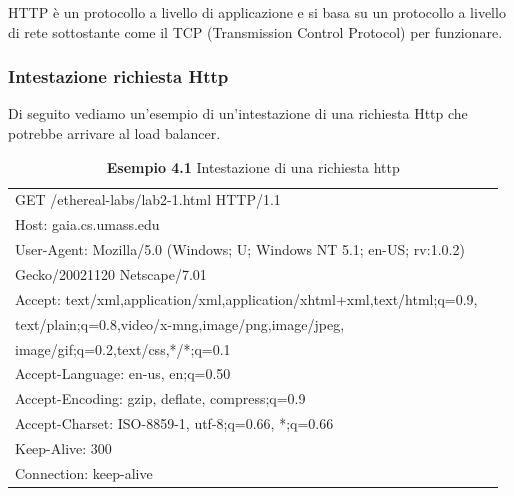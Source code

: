 \documentclass[binding=0.6cm]{sapthesis}
\theoremstyle{definition}
\begin{document}
HTTP è un protocollo a livello di applicazione e si basa su un protocollo a livello di rete sottostante come il TCP (Transmission Control Protocol) per funzionare. 


\subsubsection{Intestazione richiesta Http}
Di seguito vediamo un'esempio di un'intestazione di una richiesta Http che potrebbe arrivare
al load balancer.

\begin{table}[ht]
    \centering
    \caption*{\textbf{Esempio 4.1} Intestazione di una richiesta http}
    \begin{tabular}{ |l|c|}
        \hline
        GET /ethereal-labs/lab2-1.html HTTP/1.1   \\ 
        {Host}: gaia.cs.umass.edu   \\  
        {User-Agent}: Mozilla/5.0 (Windows; U; Windows NT 5.1; en-US; rv:1.0.2) \\Gecko/20021120 Netscape/7.01\\
        {Accept}: text/xml,application/xml,application/xhtml+xml,text/html;q=0.9,\\text/plain;q=0.8,video/x-mng,image/png,image/jpeg,\\image/gif;q=0.2,text/css,*/*;q=0.1\\ 
        {Accept-Language}: en-us, en;q=0.50\\ 
        {Accept-Encoding}: gzip, deflate, compress;q=0.9\\ 
        {Accept-Charset}: ISO-8859-1, utf-8;q=0.66, *;q=0.66\\ 
        {Keep-Alive}: 300\\ 
        {Connection}: keep-alive\\   
        \hline
    \end{tabular}

\end{table}
\end{document}
